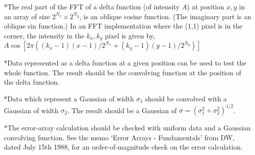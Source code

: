 \**The real part of the FFT of a delta function (of intensity $A$)
at position $x,y$ in an array of size
$2^{N_x} \times 2^{N_y}$, is an oblique cosine function. (The
imaginary part is an oblique sin function.)  In an FFT implementation
where the (1,1) pixel is in the corner, the intensity in the
$k_x,k_y$ pixel is given by, $A \cos [2 \pi ( (k_x-1)(x-1)/2^{N_x} +
(k_y-1)(y-1)/2^{N_y} )]$

\**Data represented as a delta function at a given position can be
used to test the whole function.
The result should be the convolving function at the position of the
delta function.

\**Data which represent a Gaussian of width $\sigma_1$ should be
convolved with a Gaussian of width $\sigma_2$.  The result should be a
Gaussian of $\sigma = (\sigma_1^2 + \sigma_2^2)^{1/2}$.

\**The error-array calculation should be checked with uniform data and
a Gaussian convolving function.  See the memo `Error Arrays - Fundamentals'
from DW, dated July 15th 1988, for an order-of-magnitude check on the error
calculation.


\vfill\eject






